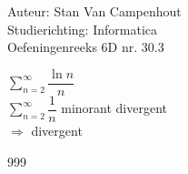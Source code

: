 \documentclass[a4paper]{article}
\begin{document}
  
\noindent \large Auteur: Stan Van Campenhout \\
\noindent \large Studierichting:  Informatica\\
\noindent \large Oefeningenreeks 6D nr. 30.3\\

\medskip

\normalsize

$ \displaystyle\sum\limits_{n = 2}^\infty\dfrac{\ln n}{n} $\\

$ \displaystyle\sum\limits_{n = 2}^\infty\dfrac{1}{n} $ minorant divergent \\

$ \Rightarrow $ divergent \\

\begin{thebibliography}{999}
\end{thebibliography}
\end{document}
